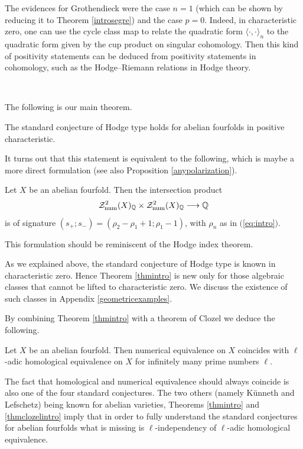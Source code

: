 The evidences for Grothendieck were the case $n=1$ (which can be shown by reducing it to Theorem \ref{introsegre}) and the case     $p=0$. Indeed,  in characteristic zero, one can use the cycle class map to relate the quadratic form $\langle \cdot, \cdot \rangle_{n}$ to the quadratic form given by the cup product on singular cohomology. Then  this kind of positivity statements can be deduced from positivity statements in cohomology, such as the Hodge--Riemann relations in Hodge theory.



\


 The following is our main theorem.

\begin{theorem}
\notready\label{thmintro}
The standard conjecture of Hodge type holds for abelian fourfolds in positive characteristic.\end{theorem}
It turns out that this statement is equivalent to the following, which is maybe a more direct formulation (see also  Proposition \ref{anypolarization}).
\begin{theorem}
\notready
Let $X$ be an abelian fourfold. Then the intersection product
\[\mathcal{Z}^2_{\mathrm{num}}(X)_{\mathbb{Q}}\times \mathcal{Z}_{\mathrm{num}}^2(X)_{\mathbb{Q}} \longrightarrow \mathbb{Q}\]
is of signature  $ (s_+;s_-) = ( \rho_2 - \rho_1+1;  \rho_1-1)$, with $\rho_n$ as in $($\ref{eq:intro}$)$.
\end{theorem}
This formulation should   be reminiscent of the Hodge index theorem.


\begin{remark}
\notready\label{remintro}
As we explained above, the standard conjecture of Hodge type is known in characteristic zero. Hence Theorem \ref{thmintro} is new only   for those algebraic classes that cannot be lifted to characteristic zero. We discuss the existence of such classes in  Appendix \ref{geometricexamples}.
\end{remark}


By combining Theorem \ref{thmintro} with  a theorem of Clozel  \cite{Clozel} we deduce the following.
\begin{theorem}
\notready\label{thmclozelintro}
Let $X$ be an   abelian fourfold. Then numerical equivalence on $X$ coincides with $\ell$-adic homological equivalence on $X$ for infinitely many prime numbers $\ell$.
\end{theorem}
The fact that homological and numerical equivalence should always coincide is also one   of the four standard conjectures. The two others (namely K\"unneth and Lefschetz) being known for abelian varieties, Theorems \ref{thmintro} and \ref{thmclozelintro} imply that in order to fully understand the standard conjectures for abelian fourfolds what is missing is $\ell$-independency of $\ell$-adic homological equivalence.

